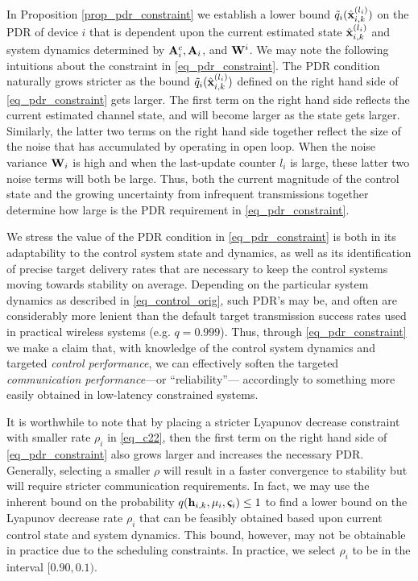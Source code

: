 
In Proposition \ref{prop_pdr_constraint} we establish a lower bound ${\tilde q}_i({\hat{\mathbf x} }^{(l_i)}_{i,k})$ on the PDR of device $i$ that is dependent upon the current estimated state ${\hat{\mathbf x} }^{(l_i)}_{i,k}$ and system dynamics determined by ${\mathbf A}^c_i, {\mathbf A}_i$, and ${\mathbf W}^i$. We may note the following intuitions about the constraint in \eqref{eq_pdr_constraint}. The PDR condition naturally grows stricter as the bound ${\tilde q}_i({\hat{\mathbf x} }^{(l_i)}_{i,k})$ defined on the right hand side of \eqref{eq_pdr_constraint} gets larger. The first term on the right hand side reflects the current estimated channel state, and will become larger as the state gets larger. Similarly, the latter two terms on the right hand side together reflect the size of the noise that has accumulated by operating in open loop. When the noise variance ${\mathbf W}_i$ is high and when the last-update counter $l_i$ is large, these latter two noise terms will both be large. Thus, both the current magnitude of the control state and the growing uncertainty from infrequent transmissions together determine how large is the PDR requirement in \eqref{eq_pdr_constraint}.


We stress the value of the PDR condition in \eqref{eq_pdr_constraint} is both in its adaptability to the control system state and dynamics, as well as its identification of precise target delivery rates that are necessary to keep the control systems moving towards stability on average. Depending on the particular system dynamics as described in \eqref{eq_control_orig}, such PDR's may be, and often are considerably more lenient than the default target transmission success rates used in practical wireless systems (e.g. $q = 0.999$). Thus, through \eqref{eq_pdr_constraint} we make a claim that, with knowledge of the control system dynamics and targeted \emph{control performance}, we can effectively soften the targeted \emph{communication performance}---or ``reliability''--- accordingly to something more easily obtained in low-latency constrained systems. 

\begin{remark}\normalfont
It is worthwhile to note that by placing a stricter Lyapunov decrease constraint with smaller  rate $\rho_i$ in \eqref{eq_c22}, then the first term on the right hand side of \eqref{eq_pdr_constraint} also grows larger and increases the necessary PDR. Generally, selecting a smaller $\rho$ will result in a faster convergence to stability but will require stricter communication requirements. In fact, we may use the inherent bound on the probability $q({\mathbf h}_{i,k},\mu_i,\boldsymbol{\varsigma}_i) \leq 1$ to find a lower bound on the Lyapunov decrease rate $\rho_i$ that can be feasibly obtained based upon current control state and system dynamics. This bound, however, may not be obtainable in practice due to the scheduling constraints. In practice, we select $\rho_i$ to be in the interval $[0.90,0.1)$. 
\end{remark}

